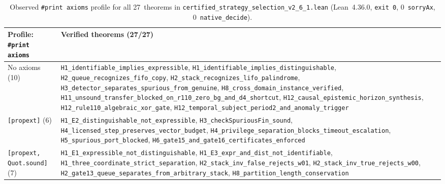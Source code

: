 \documentclass[11pt,a4paper]{article}
\theoremstyle{cleanthm}
\begin{document}
\begin{table}[H]
\centering
\caption{Observed \texttt{\#print axioms} profile for all 27~theorems in \texttt{certified\_strategy\_selection\_v2\_6\_1.lean} (Lean~4.36.0, \texttt{exit 0}, 0~\texttt{sorryAx}, 0~\texttt{native\_decide}).}
\label{tab:axioms_v26}
\footnotesize
\begin{tabularx}{\linewidth}{@{}p{.31\linewidth} >{\raggedright\arraybackslash}X@{}}
\toprule
\textbf{Profile: \texttt{\#print axioms}} & \textbf{Verified theorems (27/27)} \\
\midrule
No axioms (10) & \texttt{H1\_identifiable\_\allowbreak implies\_\allowbreak expressible}, \texttt{H1\_identifiable\_\allowbreak implies\_\allowbreak distinguishable}, \texttt{H2\_queue\_\allowbreak recognizes\_\allowbreak fifo\_\allowbreak copy}, \texttt{H2\_stack\_\allowbreak recognizes\_\allowbreak lifo\_\allowbreak palindrome}, \texttt{H3\_detector\_\allowbreak separates\_\allowbreak spurious\_\allowbreak from\_\allowbreak genuine}, \texttt{H8\_cross\_\allowbreak domain\_\allowbreak instance\_\allowbreak verified}, \texttt{H11\_unsound\_\allowbreak transfer\_\allowbreak blocked\_\allowbreak on\_\allowbreak r110\_\allowbreak zero\_\allowbreak bg\_\allowbreak and\_\allowbreak d4\_\allowbreak shortcut}, \texttt{H12\_causal\_\allowbreak epistemic\_\allowbreak horizon\_\allowbreak synthesis}, \texttt{H12\_rule110\_\allowbreak algebraic\_\allowbreak xor\_\allowbreak gate}, \texttt{H12\_temporal\_\allowbreak subject\_\allowbreak period2\_\allowbreak and\_\allowbreak anomaly\_\allowbreak trigger} \\
\texttt{[propext]} (6) & \texttt{H1\_E2\_distinguishable\_\allowbreak not\_\allowbreak expressible}, \texttt{H3\_checkSpuriousFin\_sound}, \texttt{H4\_licensed\_\allowbreak step\_\allowbreak preserves\_\allowbreak vector\_\allowbreak budget}, \texttt{H4\_privilege\_\allowbreak separation\_\allowbreak blocks\_\allowbreak timeout\_\allowbreak escalation}, \texttt{H5\_spurious\_\allowbreak port\_\allowbreak blocked}, \texttt{H6\_gate15\_\allowbreak and\_\allowbreak gate16\_\allowbreak certificates\_\allowbreak enforced} \\
\texttt{[propext, Quot.sound]} (7) & \texttt{H1\_E1\_expressible\_\allowbreak not\_\allowbreak distinguishable}, \texttt{H1\_E3\_expr\_\allowbreak and\_\allowbreak dist\_\allowbreak not\_\allowbreak identifiable}, \texttt{H1\_three\_\allowbreak coordinate\_\allowbreak strict\_\allowbreak separation}, \texttt{H2\_stack\_\allowbreak inv\_\allowbreak false\_\allowbreak rejects\_\allowbreak w01}, \texttt{H2\_stack\_\allowbreak inv\_\allowbreak true\_\allowbreak rejects\_\allowbreak w00}, \texttt{H2\_gate13\_\allowbreak queue\_\allowbreak separates\_\allowbreak from\_\allowbreak arbitrary\_\allowbreak stack}, \texttt{H8\_partition\_\allowbreak length\_\allowbreak conservation} \\

\end{tabularx}
\end{table}
\end{document}
